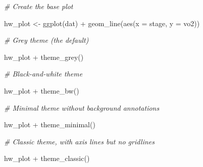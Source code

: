 \documentclass[
]{book}
\newenvironment{Shaded}{\begin{snugshade}}{\end{snugshade}}
\newcommand{\AttributeTok}[1]{\textcolor[rgb]{0.77,0.63,0.00}{#1}}
\newcommand{\CommentTok}[1]{\textcolor[rgb]{0.56,0.35,0.01}{\textit{#1}}}
\newcommand{\FunctionTok}[1]{\textcolor[rgb]{0.00,0.00,0.00}{#1}}
\newcommand{\NormalTok}[1]{#1}
\newcommand{\OtherTok}[1]{\textcolor[rgb]{0.56,0.35,0.01}{#1}}
\newcommand{\SpecialCharTok}[1]{\textcolor[rgb]{0.00,0.00,0.00}{#1}}
\begin{document}
\begin{Shaded}
\begin{Highlighting}[]
\CommentTok{\# Create the base plot}

\NormalTok{hw\_plot }\OtherTok{\textless{}{-}} \FunctionTok{ggplot}\NormalTok{(dat) }\SpecialCharTok{+}
  \FunctionTok{geom\_line}\NormalTok{(}\FunctionTok{aes}\NormalTok{(}\AttributeTok{x =}\NormalTok{ stage, }\AttributeTok{y =}\NormalTok{ vo2)) }

\CommentTok{\# Grey theme (the default)}

\NormalTok{hw\_plot }\SpecialCharTok{+}
  \FunctionTok{theme\_grey}\NormalTok{()}

\CommentTok{\# Black{-}and{-}white theme}

\NormalTok{hw\_plot }\SpecialCharTok{+}
  \FunctionTok{theme\_bw}\NormalTok{()}

\CommentTok{\# Minimal theme without background annotations}

\NormalTok{hw\_plot }\SpecialCharTok{+}
  \FunctionTok{theme\_minimal}\NormalTok{()}

\CommentTok{\# Classic theme, with axis lines but no gridlines}

\NormalTok{hw\_plot }\SpecialCharTok{+}
  \FunctionTok{theme\_classic}\NormalTok{()}
\end{Highlighting}
\end{Shaded}
\end{document}
